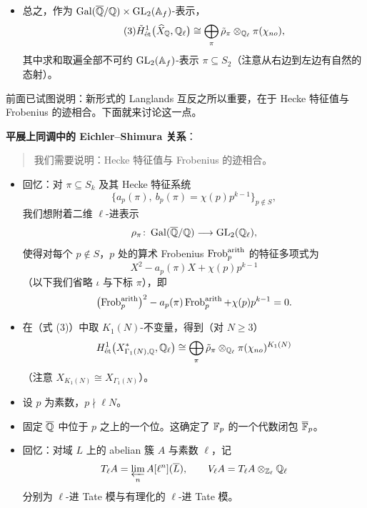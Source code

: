 \begin{itemize}
\[
\tilde\rho_\pi:=\Hom_{\GL_2(\Af)}\bigl(\pi(\chi_{no}),\tilde H^1_{\mathrm{\acute{e}t}}(\widehat X_{\Q},\Q_\ell)\bigr)
\]
是二维的：这由 Eichler--Shimura 同构
\[
\tilde H^1(\widehat X(\C),\C)\cong S_2(\chi_{no})\oplus\bar S_2(\chi_{no})
\]
以及 $S_2$ 作为 $\GL_2(\Af)$-表示的重数一性质得到。
\item 总之，作为 $\operatorname{Gal}(\overline{\mathbb{Q}}/\mathbb{Q})\times\operatorname{GL}_2(\mathbb{A}_f)$-表示，
\begin{equation}\tag{3}\label{eq:9.3}
\tilde H^1_{\mathrm{\acute{e}t}}\bigl(\widehat X_{\mathbb{Q}},\mathbb{Q}_\ell\bigr)\cong\bigoplus_\pi\tilde\rho_\pi\otimes_{\mathbb{Q}_\ell}\pi(\chi_{no}),
\end{equation}
其中求和取遍全部不可约 $\GL_2(\Af)$-表示 $\pi\subseteq S_2$（注意从右边到左边有自然的态射）。
\end{itemize}

前面已试图说明：新形式的 Langlands 互反之所以重要，在于 Hecke 特征值与 Frobenius 的迹相合。下面就来讨论这一点。

\noindent\textbf{平展上同调中的 Eichler--Shimura 关系}：
\begin{quote}
我们需要说明：Hecke 特征值与 Frobenius 的迹相合。
\end{quote}

\begin{itemize}
\item 回忆：对 $\pi\subseteq S_k$ 及其 Hecke 特征系统
\[
\bigl\{a_p(\pi),\ b_p(\pi)=\chi(p)p^{k-1}\bigr\}_{p\notin S},
\]
我们想附着二维 $\ell$-进表示
\[
\rho_\pi\colon\operatorname{Gal}(\overline{\mathbb{Q}}/\mathbb{Q})\longrightarrow\operatorname{GL}_2(\mathbb{Q}_\ell),
\]
使得对每个 $p\notin S$，$p$ 处的算术 Frobenius $\operatorname{Frob}_p^{\mathrm{arith}}$ 的特征多项式为
\[
X^2-a_p(\pi)X+\chi(p)p^{k-1}
\]
（以下我们省略 $\iota$ 与下标 $\pi$），即
\[
\bigl(\operatorname{Frob}_p^{\mathrm{arith}}\bigr)^2-a_p(\pi)\operatorname{Frob}_p^{\mathrm{arith}}+\chi(p)p^{k-1}=0 .
\]
\item 在（式 (3)）中取 $K_1(N)$-不变量，得到（对 $N\ge3$）
\[
H^1_{\mathrm{\acute{e}t}}\bigl(X^*_{\Gamma_1(N),\mathbb{Q}},\mathbb{Q}_\ell\bigr)\cong\bigoplus_\pi\tilde\rho_\pi\otimes_{\mathbb{Q}_\ell}\pi(\chi_{no})^{K_1(N)}
\]
（注意 $X_{K_1(N)}\cong X_{\Gamma_1(N)}$）。
\item 设 $p$ 为素数，$p\nmid\ell N$。
\item 固定 $\overline{\mathbb{Q}}$ 中位于 $p$ 之上的一个位。这确定了 $\mathbb{F}_p$ 的一个代数闭包 $\overline{\mathbb{F}}_p$。
\item 回忆：对域 $L$ 上的 abelian 簇 $A$ 与素数 $\ell$，记
\[
T_\ell A=\varprojlim_n A[\ell^n](\overline L),\qquad V_\ell A=T_\ell A\otimes_{\mathbb{Z}_\ell}\mathbb{Q}_\ell
\]
分别为 $\ell$-进 Tate 模与有理化的 $\ell$-进 Tate 模。
\end{itemize}

